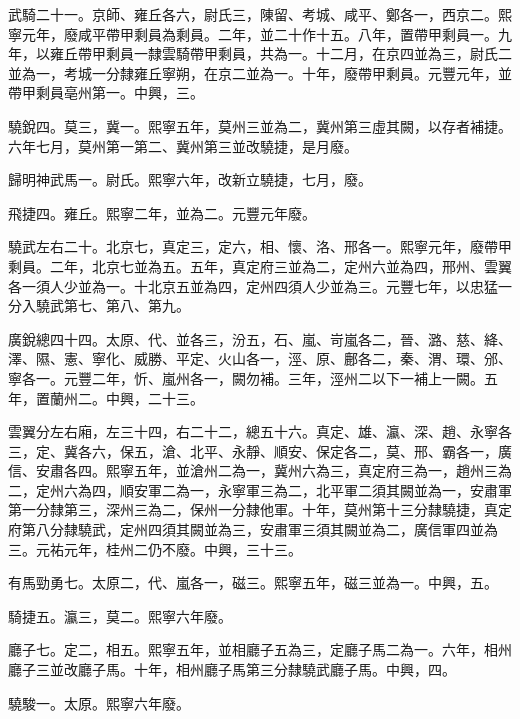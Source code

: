 \begin{pinyinscope}
 武騎二十一。京師、雍丘各六，尉氏三，陳留、考城、咸平、鄭各一，西京二。熙寧元年，廢咸平帶甲剩員為剩員。二年，並二十作十五。八年，置帶甲剩員一。九年，以雍丘帶甲剩員一隸雲騎帶甲剩員，共為一。十二月，在京四並為三，尉氏二並為一，考城一分隸雍丘寧朔，在京二並為一。十年，廢帶甲剩員。元豐元年，並帶甲剩員亳州第一。中興，三。



 驍銳四。莫三，冀一。熙寧五年，莫州三並為二，冀州第三虛其闕，以存者補捷。
 六年七月，莫州第一第二、冀州第三並改驍捷，是月廢。



 歸明神武馬一。尉氏。熙寧六年，改新立驍捷，七月，廢。



 飛捷四。雍丘。熙寧二年，並為二。元豐元年廢。



 驍武左右二十。北京七，真定三，定六，相、懷、洛、邢各一。熙寧元年，廢帶甲剩員。二年，北京七並為五。五年，真定府三並為二，定州六並為四，邢州、雲翼各一須人少並為一。十北京五並為四，定州四須人少並為三。元豐七年，以忠猛一分入驍武第七、第八、第九。



 廣銳總四十四。太原、代、並各三，汾五，石、嵐、岢嵐各二，晉、潞、慈、絳、澤、隰、憲、寧化、威勝、平定、火山各一，涇、原、鄜各二，秦、渭、環、邠、寧各一。元豐二年，忻、嵐州各一，闕勿補。三年，涇州二以下一補上一闕。五年，置蘭州二。中興，二十三。



 雲翼分左右廂，左三十四，右二十二，總五十六。真定、雄、瀛、深、趙、永寧各三，定、冀各六，保五，滄、北平、永靜、順安、保定各二，莫、邢、霸各一，廣信、安肅各四。熙寧五年，並滄州二為一，冀州六為三，真定府三為一，趙州三為
 二，定州六為四，順安軍二為一，永寧軍三為二，北平軍二須其闕並為一，安肅軍第一分隸第三，深州三為二，保州一分隸他軍。十年，莫州第十三分隸驍捷，真定府第八分隸驍武，定州四須其闕並為三，安肅軍三須其闕並為二，廣信軍四並為三。元祐元年，桂州二仍不廢。中興，三十三。



 有馬勁勇七。太原二，代、嵐各一，磁三。熙寧五年，磁三並為一。中興，五。



 騎捷五。瀛三，莫二。熙寧六年廢。



 廳子七。定二，相五。熙寧五年，並相廳子五為三，定廳子馬二為一。六年，相州廳子三並改廳子馬。十年，相州廳子馬第三分隸驍武廳子馬。中興，四。



 驍駿一。太原。熙寧六年廢。




\end{pinyinscope}
